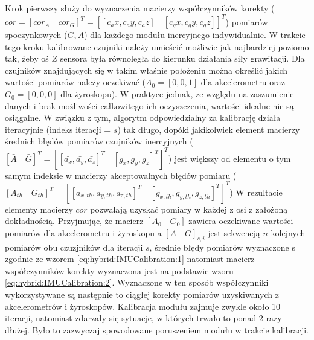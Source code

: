 Krok pierwszy służy do wyznaczenia macierzy współczynników korekty ($cor = [cor_A \quad cor_G]^T = [[c_ax,c_ay,c_az ]\quad[c_gx,c_gy,c_gz ]]^T $) pomiarów spoczynkowych ($G, A$) dla każdego modułu inercyjnego indywidualnie. W trakcie tego kroku kalibrowane czujniki należy umieścić możliwie jak najbardziej poziomo tak, żeby oś $Z$ sensora była równoległa do kierunku działania siły grawitacji. Dla czujników znajdujących się w takim właśnie położeniu można określić jakich wartości pomiarów należy oczekiwać ($A_0 = [0,0,1]$ dla akcelerometru oraz $G_0 = [0,0,0]$ dla żyroskopu). W praktyce jednak, ze względu na zaszumienie danych i brak możliwości całkowitego ich oczyszczenia, wartości idealne nie są osiągalne. W związku z tym, algorytm odpowiedzialny za kalibrację 
działa iteracyjnie (indeks iteracji = $s$) tak długo, dopóki jakikolwiek element macierzy średnich błędów pomiarów czujników inercyjnych ($[\bar{A}\quad \bar{G}]^T = [[\bar{a_x},\bar{a_y},\bar{a_z}]^T\quad[\bar{g_x},\bar{g_y},\bar{g_z}]^T]^T$)
jest większy od elementu o tym samym indeksie w macierzy akceptowalnych błędów pomiaru ($[A_{th}\quad G_{th}]^T = [[a_{x,th},a_{y,th},a_{z,th}]^T\quad[g_{x,th},g_{y,th},g_{z,th}]^T]^T $)
W rezultacie elementy macierzy $cor$ pozwalają uzyskać pomiary w każdej z osi z założoną dokładnością.
Przyjmując, że macierz $[A_0\quad G_0]$ zawiera oczekiwane wartości pomiarów dla akcelerometru i żyroskopu a $[A\quad G]_{s,i}$ jest sekwencją $n$ kolejnych pomiarów obu czuzjników dla iteracji $s$, średnie błędy pomiarów wyznaczone s zgodnie ze wzorem \eqref{eq:hybrid:IMUCalibration:1} natomiast macierz współczynników korekty wyznaczona jest na podstawie wzoru \eqref{eq:hybrid:IMUCalibration:2}. Wyznaczone w ten sposób współczynniki wykorzystywane są następnie to ciągłej korekty pomiarów uzyskiwanych z akcelerometrów i żyroskopów. Kalibracja modułu zajmuje zwykle około 10 iteracji, natomiast zdarzały się sytuacje, w których trwało to ponad 2 razy dłużej. Było to zazwyczaj spowodowane poruszeniem modułu w trakcie kalibracji.

